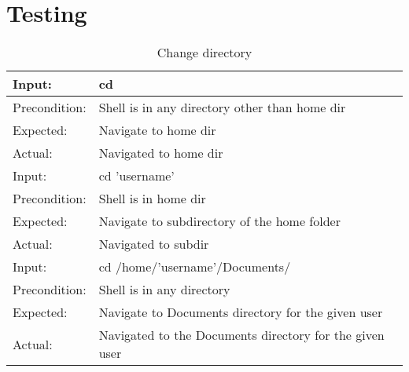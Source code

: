 \chapter{Testing}


\newcommand{\tblrow}[4]{
\hline
\rowcolor{Gray1}
Input: & #1\\ \hline
\rowcolor{Gray1}
Precondition: & #2\\
\hline \hline
Expected: & #3\\
\hline
Actual: & #4\\
\hline \hline
}

\begin{table}[ht]
\caption{Change directory}
\centering
\begin{tabular}{|p{} p{}|} \hline
\tblrow{cd}{Shell is in any directory other than home dir}{Navigate to home dir}{Navigated to home dir}
\tblrow{cd 'username'}{Shell is in home dir}
{Navigate to subdirectory of the home folder}{Navigated to subdir}
\tblrow{cd /home/'username'/Documents/}{Shell is in any directory}{Navigate to Documents directory for the given user}{Navigated to the Documents directory for the given user}

\end{tabular}
\label{table:nonlin}
\end{table}